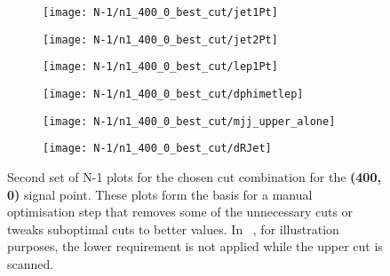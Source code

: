 \begin{figure}
	\centering
	\begin{subfigure}[b]{0.5\linewidth}
		\centering\texttt{[image: N-1/n1\_400\_0\_best\_cut/jet1Pt]}
		\caption{\label{fig:result_400_0_jet1Pt}}
	\end{subfigure}%
	\begin{subfigure}[b]{0.5\linewidth}
		\centering\texttt{[image: N-1/n1\_400\_0\_best\_cut/jet2Pt]}
		\caption{\label{fig:result_400_0_jet2Pt}}
	\end{subfigure}	
	\begin{subfigure}[b]{0.5\linewidth}
		\centering\texttt{[image: N-1/n1\_400\_0\_best\_cut/lep1Pt]}
		\caption{\label{fig:result_400_0_lep1Pt}}
	\end{subfigure}%
	\begin{subfigure}[b]{0.5\linewidth}
		\centering\texttt{[image: N-1/n1\_400\_0\_best\_cut/dphimetlep]}
		\caption{\label{fig:result_400_0_dphimetlep}}
	\end{subfigure}
	\begin{subfigure}[b]{0.5\linewidth}
		\centering\texttt{[image: N-1/n1\_400\_0\_best\_cut/mjj\_upper\_alone]}
		\caption{\label{fig:result_400_0_mjj_upper}}
	\end{subfigure}%
	\begin{subfigure}[b]{0.5\linewidth}
		\centering\texttt{[image: N-1/n1\_400\_0\_best\_cut/dRJet]}
		\caption{\label{fig:result_400_0_dRJet}}
	\end{subfigure}
	\caption[N-1 plots for the chosen cut combination for the (400,0) signal point, 2/2]{Second set of N-1 plots for the chosen cut combination for the \textbf{(400, 0)} signal point. These plots form the basis for a manual optimisation step that removes some of the unnecessary cuts or tweaks suboptimal cuts to better values. In \figname~, for illustration purposes, the lower requirement is not applied while the upper cut is scanned.}
	\label{fig:results_400_0_n-1}
\end{figure}

